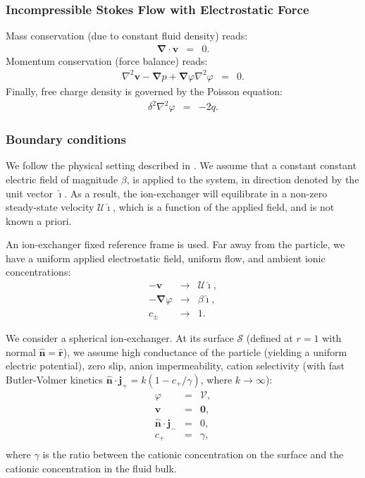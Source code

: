 \documentclass[final]{elsarticle}
\newcommand\Laplacian{\nabla^2}
\newcommand\bnabla{\boldsymbol{\nabla}}
\newcommand\bv{\boldsymbol{v}}
\newcommand\bn{\boldsymbol{\hat{n}}}
\newcommand\bj{\boldsymbol{j}}
\newcommand\br{\boldsymbol{r}}
\newcommand\brhat{\hat{\br}}
\newcommand\bzero{\boldsymbol{0}}
\newcommand\cU{\mathscr{U}}
\newcommand\cV{\mathscr{V}}
\newcommand\ui{\boldsymbol{\hat{\imath}}}
\begin{document}
\subsubsection{Incompressible Stokes Flow with Electrostatic Force}
Mass conservation (due to constant fluid density) reads:
\begin{eqnarray*}
\bnabla \cdot \bv &=& 0.
\end{eqnarray*}
Momentum conservation (force balance) reads:
\begin{eqnarray*}
\Laplacian \bv - \bnabla p + \bnabla \varphi \Laplacian \varphi &=& 0.
\end{eqnarray*}
Finally, free charge density is governed by the Poisson equation:
\begin{eqnarray*}
\delta^2 \Laplacian \varphi &=& -2q.
\end{eqnarray*}

\subsubsection{Boundary conditions}
We follow the physical setting described in \cite{yariv2010migration}.
We assume that a constant constant electric field of magnitude $\beta$,
is applied to the system, in direction denoted by the unit vector $\ui$.
As a result, the ion-exchanger will equilibrate in 
a non-zero steady-state velocity $\cU \ui$, which is
a function of the applied field, and is not known a priori.

An ion-exchanger fixed reference frame is used.
Far away from the particle, we have a uniform applied electrostatic field, uniform flow,
and ambient ionic concentrations:
\begin{eqnarray*}
-\bv &\rightarrow& \cU \ui, \\
-\bnabla \varphi &\rightarrow& \beta\ui, \\
c_\pm &\rightarrow& 1.
\end{eqnarray*}

We consider a spherical ion-exchanger. 
At its surface $\mathcal{S}$ (defined at $r=1$ with normal $\bn = \brhat$), 
we assume high conductance of the particle (yielding a uniform electric potential),
zero slip, anion impermeability, cation selectivity 
(with fast Butler-Volmer\cite{bard2000book} kinetics
$\bn \cdot \bj_+ = k (1 - c_+/\gamma)$, where $k \rightarrow \infty$):
\begin{eqnarray*}
\varphi & = & \cV, \\
\bv & = & \bzero, \\
\bn \cdot \bj_- & = & 0, \\
c_+ &=& \gamma, \\
\end{eqnarray*}
where $\gamma$ is the ratio between the cationic concentration on the surface and the cationic
concentration in the fluid bulk.
\end{document}
